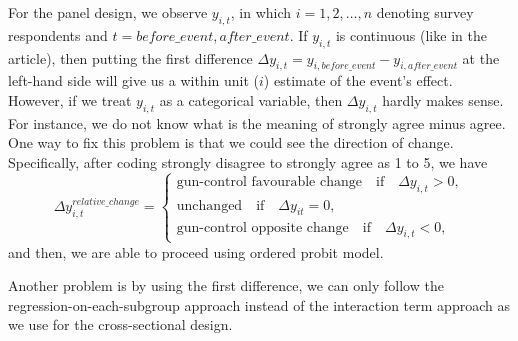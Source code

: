 \documentclass[11pt]{article}
\begin{document}
For the panel design, we observe \(y_{i, t}\), in which \(i = 1, 2, \ldots, n\) denoting survey respondents and \(t = before\_event, after\_event\). If \(y_{i, t}\) is continuous (like in the article), then putting the first difference \(\Delta y_{i, t} = y_{i, before\_event} - y_{i, after\_event}\) at the left-hand side will give us a within unit (\(i\)) estimate of the event's effect. However, if we treat \(y_{i, t}\) as a categorical variable, then \(\Delta y_{i, t}\) hardly makes sense. For instance, we do not know what is the meaning of strongly agree minus agree. One way to fix this problem is that we could see the direction of change. Specifically, after coding strongly disagree to strongly agree as 1 to 5, we have
\[
\Delta y_{i, t}^{relative\_change} = 
\begin{cases}
\text{gun-control favourable change} \quad \text{if} \quad \Delta y_{i,t} > 0,\\
\text{unchanged} \quad \text{if} \quad \Delta y_{it} = 0,\\
\text{gun-control opposite change} \quad \text{if} \quad \Delta y_{i,t} < 0,
\end{cases}
\]
and then, we are able to proceed using ordered probit model.

Another problem is by using the first difference, we can only follow the regression-on-each-subgroup approach instead of the interaction term approach as we use for the cross-sectional design.
\end{document}
